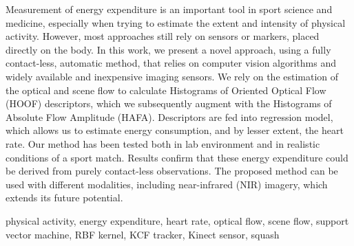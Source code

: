\abstract
Measurement of energy expenditure is an important tool in sport science and medicine, especially when trying to estimate the extent and intensity of physical activity. However, most approaches still rely on sensors or markers, placed directly on the body. In this work, we present a novel approach, using a fully contact-less, automatic method, that relies on computer vision algorithms and widely available and inexpensive imaging sensors. We rely on the estimation of the optical and scene flow to calculate Histograms of Oriented Optical Flow (HOOF) descriptors, which we subsequently augment with the Histograms of Absolute Flow Amplitude (HAFA). Descriptors are fed into regression model, which allows us to estimate energy consumption, and by lesser extent, the heart rate. Our method has been tested both in lab environment and in realistic conditions of a sport match. Results confirm that these energy expenditure could be derived from purely contact-less observations. The proposed method can be used with different modalities, including near-infrared (NIR) imagery, which extends its future potential.

\keywords physical activity, energy expenditure, heart rate, optical flow, scene flow, support vector machine, RBF kernel, KCF tracker, Kinect sensor, squash